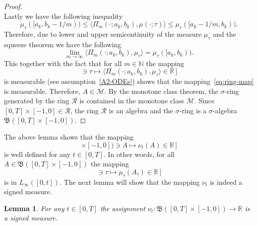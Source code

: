 \documentclass[reqno]{amsart}
\theoremstyle{plain}
\newtheorem{lemma}{Lemma}[section]
\numberwithin{equation}{section}
\numberwithin{definition}{section}
\newcommand\RR{\ensuremath{\mathbb{R}}}
\newcommand\NN{\ensuremath{\mathbb{N}}}
\begin{document}
\begin{proof}
\begin{equation*}
\end{equation*}
Lastly we have the following inequality 
\begin{equation*}
  \mu_{\tau}( [a_k,b_k-1/m) )  \le \langle \Pi_m(\cdot;a_k,b_k), \mu(\cdot ; \tau)  \rangle \le \mu_{\tau}([a_k-1/m,b_k) ).
\end{equation*}
Therefore, due to lower and upper semicontinuity of the measure $\mu_{\tau}$ and the squeeze theorem we have the following 
\begin{equation*}
    \lim_{m\to\infty} \langle \Pi_m(\cdot;a_k,b_k), \mu_{\tau} \rangle  = \mu_{\tau}([a_k,b_k)). 
\end{equation*}
This together with the fact that for all $m\in\NN$ the mapping 
\begin{equation*}
    [\, [0,T]\ni \tau \mapsto \langle \Pi_m(\cdot;a_k,b_k), \mu_{\tau}  \rangle \in \RR \,]
\end{equation*} 
is measurable (see assumption~\ref{A2-ODEs}) shows that the mapping~\ref{eq:ring-map} is measurable. Therefore, $A\in\mathcal{M}$. By the monotone class theorem, the $\sigma$\nobreakdash-\hspace{0pt}ring generated by the ring $\mathcal{R}$ is contained in the monotone class $\mathcal{M}$. Since $[0,T]\times [-1,0] \in \mathcal{R}$, the ring $\mathcal{R}$ is an algebra and the $\sigma$\nobreakdash-\hspace{0pt}ring is a  $\sigma$\nobreakdash-\hspace{0pt}algebra $\mathfrak{B}([0,T]\times [-1,0])$.      
\end{proof}
The above lemma shows that the mapping 
\begin{equation*}
    [\, \mathfrak{B}([0,t]\times [-1,0]) \ni A \mapsto \nu_t(A) \in \RR \,]
\end{equation*} 
is well defined for any $t\in [0,T]$. In other words, for all $A \in \mathfrak{B}([0,T]\times [-1,0])$ the mapping 
\begin{equation*}
    [\,[0,t]\ni \tau \mapsto \mu_{\tau}(A_{\tau})\in\RR\,]
\end{equation*}
is in $L_{\infty}([0,t])$. The next lemma will show that the mapping $\nu_t$ is indeed a signed measure.  
\begin{lemma} For any $t\in[0,T]$ the assignment $\nu_t:\mathfrak{B}([0,T]\times [-1,0]) \to \RR$ is a signed measure. \end{lemma}
\end{document}
